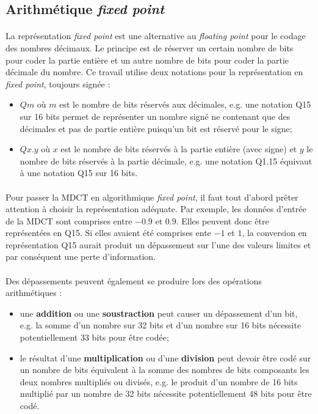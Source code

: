 \documentclass{article}
\begin{document}
    \subsection{Arithmétique \emph{fixed point}}

    \paragraph{}
    La représentation \emph{fixed point} est une alternative au \emph{floating point} pour le codage des nombres décimaux\cite{2007-Oberstar}. Le principe est de réserver un certain nombre de bits pour coder la partie entière et un autre nombre de bits pour coder la partie décimale du nombre. Ce travail utilise deux notations pour la représentation en \emph{fixed point}, toujours signée :
    \begin{itemize}
        \item $Qm$ où $m$ est le nombre de bits réservés aux décimales, e.g. une notation Q15 sur 16 bits permet de représenter un nombre signé ne contenant que des décimales et pas de partie entière puisqu'un bit est réservé pour le signe;
        \item $Qx.y$ où $x$ est le nombre de bits réservés à la partie entière (avec signe) et $y$ le nombre de bits réservés à la partie décimale, e.g. une notation Q1.15 équivaut à une notation Q15 sur 16 bits.
    \end{itemize}

    \paragraph{}
    Pour passer la MDCT en algorithmique \emph{fixed point}, il faut tout d'abord prêter attention à choisir la représentation adéquate. Par exemple, les données d'entrée de la MDCT sont comprises entre $-0.9$ et $0.9$. Elles peuvent donc être représentées en Q15. Si elles avaient été comprises ente $-1$ et $1$, la conversion en représentation Q15 aurait produit un dépassement sur l'une des valeurs limites et par conséquent une perte d'information.

    \paragraph{}
    Des dépassements peuvent également se produire lors des opérations arithmétiques :
    \begin{itemize}
        \item une \textbf{addition} ou une \textbf{soustraction} peut causer un dépassement d'un bit, e.g. la somme d'un nombre sur 32 bits et d'un nombre sur 16 bits nécessite potentiellement 33 bits pour être codée;
        \item le résultat d'une \textbf{multiplication} ou d'une \textbf{division} peut devoir être codé sur un nombre de bits équivalent à la somme des nombres de bits composants les deux nombres multipliés ou divisés, e.g. le produit d'un nombre de 16 bits multiplié par un nombre de 32 bits nécessite potentiellement 48 bits pour être codé.
    \end{itemize}
\end{document}
